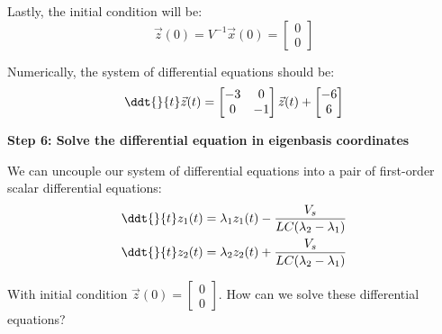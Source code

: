 {  Lastly, the initial condition will be:
  $$\vec{z}(0) = V^{-1} \vec{x}(0) = \begin{bmatrix} 0 \\ 0 \end{bmatrix}$$

  Numerically, the system of differential equations should be:
  \begin{equation}
  \ddt{}{t} \vec{z}(t) = \begin{bmatrix} -3 & 0 \\ 0 & -1 \end{bmatrix} \vec{z}(t) + \begin{bmatrix} -6 \\ 6 \end{bmatrix}
  \end{equation}
}

\qitem \textbf{Step 6: Solve the differential equation in eigenbasis coordinates}

We can uncouple our system of differential equations into a pair of first-order scalar differential equations:
  \begin{gather*}
    \ddt{}{t} z_{1}(t) = \lambda_1 z_{1}(t) - \frac{V_s}{LC(\lambda_{2} - \lambda_{1})} \\
    \ddt{}{t} z_{2}(t) = \lambda_2 z_{2}(t) + \frac{V_s}{LC(\lambda_{2} - \lambda_{1})}
  \end{gather*}

With initial condition $\vec{z}(0) = \begin{bmatrix} 0 \\ 0 \end{bmatrix}.$
How can we solve these differential equations?

